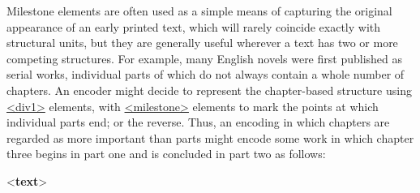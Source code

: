 Milestone elements are often used as a simple means of capturing the original appearance of an early printed text, which will rarely coincide exactly with structural units, but they are generally useful wherever a text has two or more competing structures. For example, many English novels were first published as serial works, individual parts of which do not always contain a whole number of chapters. An encoder might decide to represent the chapter-based structure using \hyperref[TEI.div1]{<div1>} elements, with \hyperref[TEI.milestone]{<milestone>} elements to mark the points at which individual parts end; or the reverse. Thus, an encoding in which chapters are regarded as more important than parts might encode some work in which chapter three begins in part one and is concluded in part two as follows: \par\bgroup{}\exampleFont \begin{shaded}\noindent\mbox{}{<\textbf{text}>}\mbox{}\newline 
{}\mbox{}\newline 
\hspace*{1em}\mbox{}\newline 
\hspace*{1em}\mbox{}\newline 
\hspace*{1em}\hspace*{1em}\mbox{}\newline 

\end{shaded}
